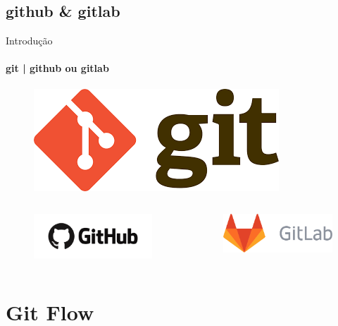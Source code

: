 \documentclass[xcolor=dvipsnames,t]{beamer}
\begin{document}
\subsection{github \& gitlab}
\begin{frame}{Introdução}
\framesubtitle{git | github ou gitlab}

\vfill
\begin{figure}
	\centering
	\includegraphics[width=0.2\linewidth]{figures/gitlogo.png}
\end{figure}
\vfill
\begin{columns}[t]
	\begin{column}{.5\textwidth}
\begin{figure}
	\centering
	\includegraphics[width=0.7\linewidth]{figures/Github_logo}
\end{figure}
	\end{column}
	\begin{column}{.5\textwidth}
\begin{figure}
	\centering
	\includegraphics[width=0.7\linewidth]{figures/GitLab_logo}
\end{figure}
	\end{column}
\end{columns}
\vfill

\end{frame}

\section{Git Flow}

\begin{frame}{}
	\tiny
	\tableofcontents[current]
\end{frame}
\end{document}
